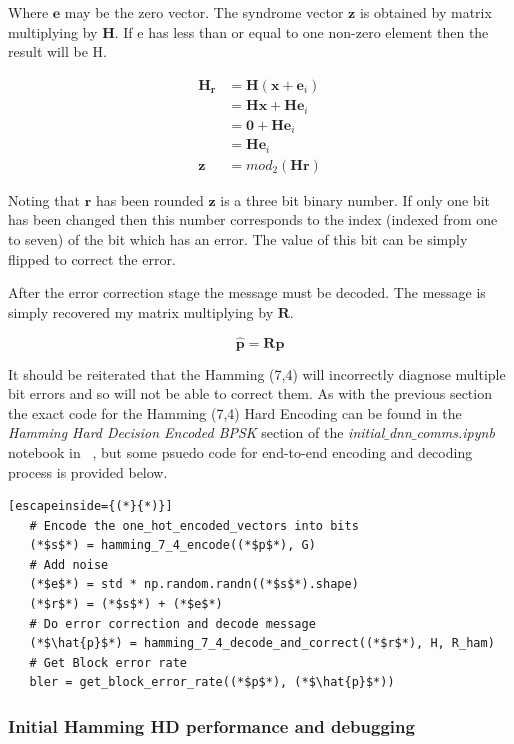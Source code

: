 \documentclass[12pt,onecolumn,letterpaper]{article}
\newcommand{\code}{\textit}
\begin{document}
Where $\mathbf{e}$ may be the zero vector. The syndrome vector $\mathbf{z}$ is obtained by matrix multiplying by $\mathbf{H}$. If e has less than or equal to one non-zero element then the result will be H.

\begin{align}
   \mathbf{H_r} &= \mathbf{H}(\mathbf{x} + \mathbf{e}_i) \\
   &= \mathbf{Hx} + \mathbf{He}_i \\
   &= \mathbf{0} + \mathbf{He}_i \\
   &= \mathbf{He}_i \\
   \mathbf{z} &= mod_2\left(\mathbf{Hr}\right)
\end{align}

Noting that $\mathbf{r}$ has been rounded $\mathbf{z}$ is a three bit binary number. If only one bit has been changed then this number corresponds to the index (indexed from one to seven) of the bit which has an error. The value of this bit can be simply flipped to correct the error.

After the error correction stage the message must be decoded. The message is simply recovered my matrix multiplying by $\mathbf{R}$.

\begin{equation}
   \hat{\mathbf{p}} = \mathbf{Rp}
\end{equation}

It should be reiterated that the Hamming (7,4) will incorrectly diagnose multiple bit errors and so will not be able to correct them. As with the previous section the exact code for the Hamming (7,4) Hard Encoding can be found in the \textit{Hamming Hard Decision Encoded BPSK} section of the \code{initial$\_$dnn$\_$comms.ipynb} notebook in ~\cite{AwGithub}, but some psuedo code for end-to-end encoding and decoding process is provided below.

\begin{lstlisting}[escapeinside={(*}{*)}]
   # Encode the one_hot_encoded_vectors into bits
   (*$s$*) = hamming_7_4_encode((*$p$*), G)   
   # Add noise
   (*$e$*) = std * np.random.randn((*$s$*).shape)
   (*$r$*) = (*$s$*) + (*$e$*)
   # Do error correction and decode message
   (*$\hat{p}$*) = hamming_7_4_decode_and_correct((*$r$*), H, R_ham)
   # Get Block error rate
   bler = get_block_error_rate((*$p$*), (*$\hat{p}$*))
\end{lstlisting}

\subsubsection{Initial Hamming HD performance and debugging}
\end{document}
